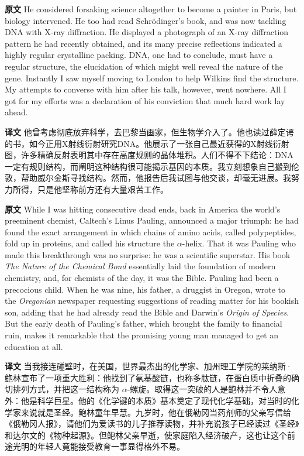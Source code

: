 \documentclass[UTF8,zihao=-4]{ctexart}
\newcommand{\BodyFont}{\fontsize{10.5pt}{15.5pt}\selectfont}
\renewenvironment{quote}{\par\noindent\begingroup\BodyFont}{\par\endgroup}
\begin{document}
\begin{quote}
\noindent\textbf{原文} He considered forsaking science altogether to become a painter in Paris, but biology intervened. He too had read Schrödinger's book, and was now tackling DNA with X-ray diffraction. He displayed a photograph of an X-ray diffraction pattern he had recently obtained, and its many precise reflections indicated a highly regular crystalline packing. DNA, one had to conclude, must have a regular structure, the elucidation of which might well reveal the nature of the gene. Instantly I saw myself moving to London to help Wilkins find the structure. My attempts to converse with him after his talk, however, went nowhere. All I got for my efforts was a declaration of his conviction that much hard work lay ahead.

\smallskip
\noindent\textbf{译文} 他曾考虑彻底放弃科学，去巴黎当画家，但生物学介入了。他也读过薛定谔的书，如今正用X射线衍射研究DNA。他展示了一张自己最近获得的X射线衍射图，许多精确反射表明其中存在高度规则的晶体堆积。人们不得不下结论：DNA一定有规则结构，而阐明这种结构很可能揭示基因的本质。我立刻想象自己搬到伦敦，帮助威尔金斯寻找结构。然而，他报告后我试图与他交谈，却毫无进展。我努力所得，只是他坚称前方还有大量艰苦工作。
\end{quote}

\begin{quote}
\noindent\textbf{原文} While I was hitting consecutive dead ends, back in America the world's preeminent chemist, Caltech's Linus Pauling, announced a major triumph: he had found the exact arrangement in which chains of amino acids, called polypeptides, fold up in proteins, and called his structure the \(\alpha\)-helix. That it was Pauling who made this breakthrough was no surprise: he was a scientific superstar. His book \emph{The Nature of the Chemical Bond} essentially laid the foundation of modern chemistry, and, for chemists of the day, it was the Bible. Pauling had been a precocious child. When he was nine, his father, a druggist in Oregon, wrote to the \emph{Oregonian} newspaper requesting suggestions of reading matter for his bookish son, adding that he had already read the Bible and Darwin's \emph{Origin of Species}. But the early death of Pauling's father, which brought the family to financial ruin, makes it remarkable that the promising young man managed to get an education at all.

\smallskip
\noindent\textbf{译文} 当我接连碰壁时，在美国，世界最杰出的化学家、加州理工学院的莱纳斯·鲍林宣布了一项重大胜利：他找到了氨基酸链，也称多肽链，在蛋白质中折叠的确切排列方式，并把这一结构称为 \(\alpha\)-螺旋。取得这一突破的人是鲍林并不令人意外：他是科学巨星。他的《化学键的本质》基本奠定了现代化学基础，对当时的化学家来说就是圣经。鲍林童年早慧。九岁时，他在俄勒冈当药剂师的父亲写信给《俄勒冈人报》，请他们为爱读书的儿子推荐读物，并补充说孩子已经读过《圣经》和达尔文的《物种起源》。但鲍林父亲早逝，使家庭陷入经济破产，这也让这个前途光明的年轻人竟能接受教育一事显得格外不易。
\end{quote}
\end{document}
